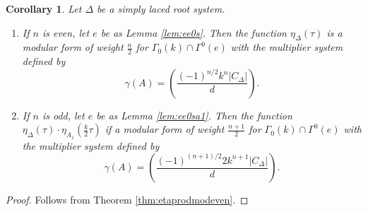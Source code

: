 \documentclass[11pt,a4paper]{amsart}
\newtheorem{corollary}[theorem]{Corollary}
\theoremstyle{definition}
\begin{document}
\begin{corollary}  Let $\Delta$ be a simply laced root system. 
\begin{enumerate}
\item If $n$ is even, let $e$ be as Lemma \ref{lem:ee0s}. Then the function $\eta_{\Delta}(\tau)$ is a modular form of weight $\frac{n}{2}$ for $\Gamma_0(k)\cap\Gamma^0(e)$ with the multiplier system defined by
\[ \gamma(A)=\left( \frac{(-1)^{n/2}k^n|C_{\Delta}|}{d} \right). \]
\item If $n$ is odd, let $e$ be as Lemma \ref{lem:ee0sa1}. Then the function $\eta_{\Delta}(\tau) \cdot \eta_{A_1}(\frac{k}{2}\tau)$ if a modular form of weight $\frac{n+1}{2}$ for $\Gamma_0(k)\cap\Gamma^0(e)$ with the multiplier system defined by
\[ \gamma(A)=\left( \frac{(-1)^{(n+1)/2}2k^{n+1}|C_{\Delta}|}{d} \right). \]
\end{enumerate}
\label{cor:etamultsyscalc}
\end{corollary}
\begin{proof} Follows from Theorem \ref{thm:etaprodmodeven}.
\end{proof}
\end{document}
